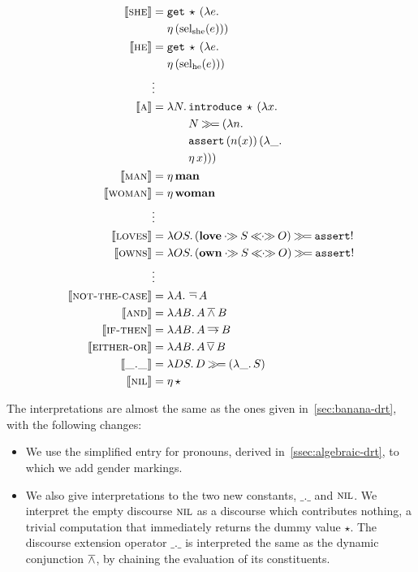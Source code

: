 \begin{align*}
  \lex{she}{\begin{aligned}[t]
      &\app{\op{get}}{\star}{(\lam{e}{ \\
      &\etaE{(\selshe(e))}})}
    \end{aligned}} \\
  \lex{he}{\begin{aligned}[t]
      &\app{\op{get}}{\star}{(\lam{e}{ \\
      &\etaE{(\selhe(e))}})}
    \end{aligned}} \\
  &\vdots \\
  \lex{a}{\begin{aligned}[t]
      \lam{N}{&\app{\op{introduce}}{\star}{(\lam{x}{ \\
              &N \hsbind (\lam {n}{ \\
              &\app{\op{assert}}{(n(x))}{(\lam{\_}{ \\
              &\etaE{x}})}})})}}
    \end{aligned}} \\
  \lex{man}{\etaE{\obj{man}}} \\
  \lex{woman}{\etaE{\obj{woman}}} \\
  &\vdots \\
  \lex{loves}{\lam{O S}{(\obj{love} \apr S \aplr O) \hsbind \op{assert}!}} \\
  \lex{owns}{\lam{O S}{(\obj{own} \apr S \aplr O) \hsbind \op{assert}!}} \\
  &\vdots \\
  \lex{not-the-case}{\lam{A}{\dnot A}} \\
  \lex{and}{\lam{A B}{A \dand B}} \\
  \lex{if-then}{\lam{A B}{A \dimp B}} \\
  \lex{either-or}{\lam{A B}{A \dor B}} \\
  \lex{\_.\_}{\lam{D S}{D \hsbind (\lam{\_}{S})}} \\
  \lex{nil}{\etaE{\star}}
\end{align*}

The interpretations are almost the same as the ones given
in~\ref{sec:banana-drt}, with the following changes:

\begin{itemize}
\item We use the simplified entry for pronouns, derived
  in~\ref{ssec:algebraic-drt}, to which we add gender markings.
\item We also give interpretations to the two new constants, $\_.\_$ and
  $\textsc{nil}$. We interpret the empty discourse $\textsc{nil}$ as a discourse
  which contributes nothing, a trivial computation that immediately returns
  the dummy value $\star$. The discourse extension operator $\_.\_$ is
  interpreted the same as the dynamic conjunction $\mathbin{\overline{\land}}$, by chaining the
  evaluation of its constituents.
\end{itemize}


